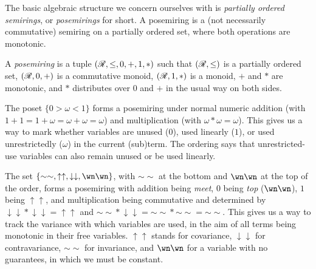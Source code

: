 The basic algebraic structure we concern ourselves with is \emph{partially
ordered semirings}, or \emph{posemirings} for short.
A posemiring is a (not necessarily commutative) semiring on a partially ordered
set, where both operations are monotonic.

\begin{definition}
  A \emph{posemiring} is a tuple $(\mathscr R, \leq, 0, +, 1, *)$ such that
  $(\mathscr R, \leq)$ is a partially ordered set, $(\mathscr R, 0, +)$ is a commutative
  monoid, $(\mathscr R, 1, *)$ is a monoid, $+$ and $*$ are monotonic, and $*$
  distributes over $0$ and $+$ in the usual way on both sides.
\end{definition}

\begin{example}\label{thm:linearity}
  The poset $\{0 > \omega < 1\}$ forms a posemiring under normal numeric
  addition (with $1 + 1 = 1 + \omega = \omega + \omega = \omega$) and
  multiplication (with $\omega * \omega = \omega$).
  This gives us a way to mark whether variables are unused ($0$), used linearly
  ($1$), or used unrestrictedly ($\omega$) in the current (sub)term.
  The ordering says that unrestricted-use variables can also remain unused or
  be used linearly.
\end{example}

\begin{example}[Variance]\label{thm:variance}
  The set
  $\{{\sim\sim}, {\uparrow\uparrow}, {\downarrow\downarrow}, {\wn\wn}\}$,
  with ${\sim\sim}$ at the bottom and ${\wn\wn}$ at the top of the order, forms
  a posemiring with addition being \emph{meet}, $0$ being \emph{top}
  (${\wn\wn}$), $1$ being ${\uparrow\uparrow}$, and multiplication being
  commutative and determined by
  ${\downarrow\downarrow} * {\downarrow\downarrow} = {\uparrow\uparrow}$ and
  ${\sim\sim} * {\downarrow\downarrow} = {\sim\sim} * {\sim\sim} = {\sim\sim}$.
  This gives us a way to track the variance with which variables are used, in
  the aim of all terms being monotonic in their free variables.
  ${\uparrow\uparrow}$ stands for covariance, ${\downarrow\downarrow}$ for
  contravariance, ${\sim\sim}$ for invariance, and ${\wn\wn}$ for a variable
  with no guarantees, in which we must be constant.
\end{example}

